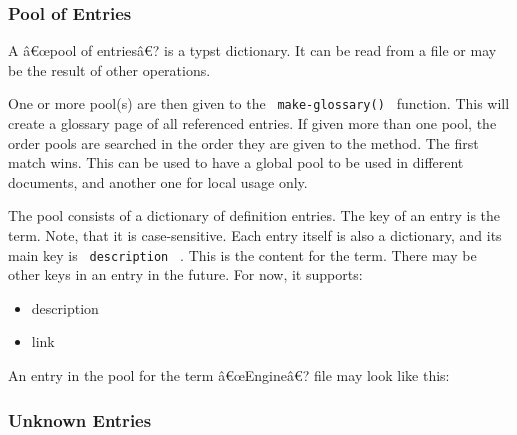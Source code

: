 \subsubsection{Pool of Entries}\label{pool-of-entries}

A â€œpool of entriesâ€? is a typst dictionary. It can be read from a
file or may be the result of other operations.

One or more pool(s) are then given to the \texttt{\ make-glossary()\ }
function. This will create a glossary page of all referenced entries. If
given more than one pool, the order pools are searched in the order they
are given to the method. The first match wins. This can be used to have
a global pool to be used in different documents, and another one for
local usage only.

The pool consists of a dictionary of definition entries. The key of an
entry is the term. Note, that it is case-sensitive. Each entry itself is
also a dictionary, and its main key is \texttt{\ description\ } . This
is the content for the term. There may be other keys in an entry in the
future. For now, it supports:

\begin{itemize}
\tightlist
\item
  description
\item
  link
\end{itemize}

An entry in the pool for the term â€œEngineâ€? file may look like this:

\begin{Shaded}
\begin{Highlighting}[]
\NormalTok{        description: [}


\NormalTok{        ],}
\NormalTok{        link: [}


\NormalTok{        ]}
\NormalTok{    ),}
\end{Highlighting}
\end{Shaded}

\subsubsection{Unknown Entries}\label{unknown-entries}

